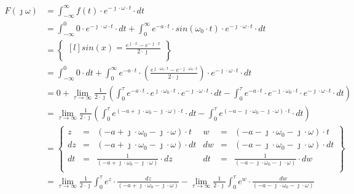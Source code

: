 \begin{task}
\begin{align*}
F(\jmath \omega )&=\int_{-\infty }^{\infty}f(t) \cdot e^{-\jmath \cdot \omega \cdot t}\cdot dt\\
&=\int_{-\infty}^{0} 0 \cdot e^{-\jmath \cdot \omega \cdot t}\cdot dt
+\int_{0}^{\infty} e^{-a \cdot t} \cdot sin(\omega_{0} \cdot t) \cdot e^{-\jmath \cdot \omega \cdot t}\cdot dt\\
&=\begin{Bmatrix*}[l]%
sin(x)=\frac{e^{\jmath \cdot x} - e^{-\jmath \cdot x}}{2 \cdot \jmath}\\
\end{Bmatrix*}\\
&=\int_{-\infty}^{0} 0 \cdot dt +\int_{0}^{\infty} e^{-a \cdot t} \cdot \left(\frac{e^{\jmath \cdot \omega_{0} \cdot t} - e^{-\jmath \cdot  \omega_{0} \cdot t}}{2 \cdot \jmath} \right) \cdot e^{-\jmath \cdot \omega \cdot t}\cdot dt\\
&=0 + \lim_{\tau \rightarrow \infty }\frac{1}{2 \cdot \jmath}\left(
\int_{0}^{\tau} e^{-a\cdot t}\cdot e^{\jmath \cdot \omega_{0} \cdot t} \cdot e^{-\jmath \cdot \omega \cdot t} \cdot dt
-\int_{0}^{\tau} e^{-a\cdot t}\cdot e^{-\jmath \cdot \omega_{0} \cdot t} \cdot e^{-\jmath \cdot \omega \cdot t} \cdot dt \right)\\
&=\lim_{\tau \rightarrow \infty }\frac{1}{2 \cdot \jmath}\left(
\int_{0}^{\tau} e^{(-a + \jmath \cdot \omega_{0} -\jmath \cdot \omega) \cdot t} \cdot dt
-\int_{0}^{\tau} e^{(-a - \jmath \cdot \omega_{0} -\jmath \cdot \omega) \cdot t} \cdot dt \right)\\
&=\begin{Bmatrix}
z&=&(-a + \jmath \cdot \omega_{0} -\jmath \cdot \omega) \cdot t&w&=&(-a - \jmath \cdot \omega_{0} -\jmath \cdot \omega) \cdot t\\
dz&=&(-a + \jmath \cdot \omega_{0} -\jmath \cdot \omega) \cdot dt&dw&=&(-a - \jmath \cdot \omega_{0} -\jmath \cdot \omega) \cdot dt\\
dt&=&\frac{1}{(-a + \jmath \cdot \omega_{0} -\jmath \cdot \omega)} \cdot dz&dt&=&\frac{1}{(-a - \jmath \cdot \omega_{0} -\jmath \cdot \omega)} \cdot dw\\
\end{Bmatrix}\\
&=\lim_{\tau \rightarrow \infty }\frac{1}{2 \cdot \jmath}
\int_{0}^{\tau} e^{z} \cdot \frac{dz}{(-a + \jmath \cdot \omega_{0} -\jmath \cdot \omega)}
-\lim_{\tau \rightarrow \infty }\frac{1}{2 \cdot \jmath}
\int_{0}^{\tau} e^{w} \cdot \frac{dw}{(-a - \jmath \cdot \omega_{0} -\jmath \cdot \omega)}\\

\end{align*}
\end{task}
